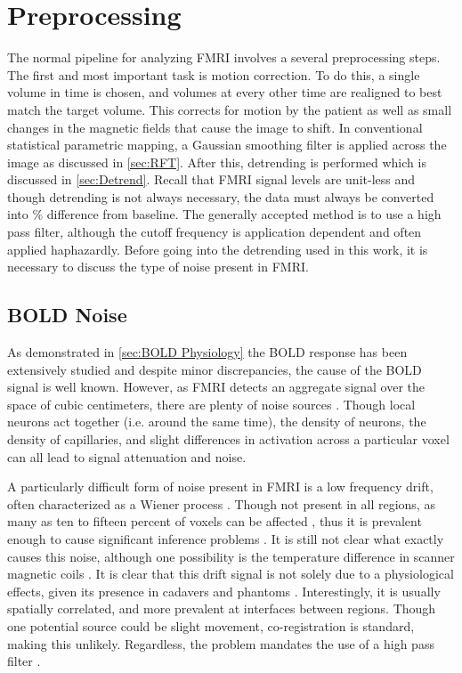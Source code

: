 \section{Preprocessing}
\label{sec:Methods Preprocessing}
The normal pipeline for analyzing
FMRI involves a several preprocessing steps. The first and most important
task is motion correction. To do this, a single volume in time is chosen, and
volumes at every other time are realigned to best match the target volume. This corrects
for motion by the patient as well as small changes in the magnetic
fields that cause the image to shift. 
In conventional statistical parametric mapping, a Gaussian smoothing
filter is applied across the image as discussed in \autoref{sec:RFT}.
After this, detrending is performed which is discussed in \autoref{sec:Detrend}.
Recall that FMRI signal levels are unit-less and though detrending is not
always necessary, the data must always be converted 
into \% difference from baseline. 
The generally accepted method is to use a high pass filter, although the
cutoff frequency is application dependent and often applied haphazardly.
Before going into the detrending used in this work, it is necessary to 
discuss the type of noise present in FMRI.

\subsection{BOLD Noise}
\label{sec:Introduction Noise}
As demonstrated in \autoref{sec:BOLD Physiology} the BOLD response has been
extensively studied and despite minor discrepancies, the cause of the BOLD 
signal is well known. However, as FMRI detects an  
aggregate signal over the space of cubic centimeters, there are
plenty of noise sources . Though local neurons act
together (i.e. around the same time), the density of neurons, the
density of capillaries, and slight differences in activation across 
a particular voxel can all lead to signal attenuation and noise. 

A particularly difficult form of noise present in FMRI is a low frequency
drift, often characterized as a Wiener process \cite{Riera2004}. 
Though not present in all regions, as many as ten to fifteen percent
of voxels can be affected \cite{Tanabe2002}, thus it is prevalent enough to cause significant
inference problems \cite{Smith2007}. It is still not
clear what exactly causes this noise, although one possibility is 
the temperature difference in scanner magnetic coils \cite{Smith2007}. 
It is clear that this drift signal is not solely
due to a physiological effects, given its presence in cadavers and phantoms 
\cite{Smith1999}. Interestingly, it is usually spatially correlated, and
more prevalent at interfaces between regions. Though one potential source
could be slight movement, co-registration is standard, making this unlikely. 
Regardless, the problem mandates the use of a high pass filter \cite{Smith2007}.

